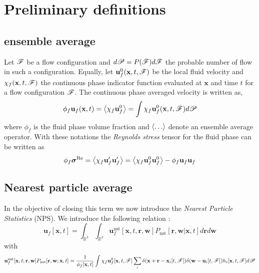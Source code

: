 \documentclass[11pt]{My_preprint}
\begin{document}
\section{Preliminary definitions}

\subsection{ensemble average}
Let $\mathscr{F}$ be a flow configuration and $d\mathscr{P} = P(\mathscr{F})d\mathscr{F}$ the probable number of flow in such a configuration. 
Equally, let $\textbf{u}_f^0(\textbf{x},t,\mathscr{F})$ be the local fluid velocity and $\chi_f(\textbf{x},t,\mathscr{F})$ the continuous phase indicator function evaluated at $\textbf{x}$ and time $t$ for a flow configuration $\mathscr{F}$. 
The continuous phase averaged velocity is written as, 
\begin{equation}
    \phi_f \textbf{u}_f(\textbf{x},t)
    = \left<\chi_f \textbf{u}_f^0\right> 
    = \int  \chi_f \textbf{u}_f^0(\textbf{x},t,\mathscr{F}) d\mathscr{P}
\end{equation}
where $\phi_f$ is the fluid phase volume fraction and $\left<\ldots\right>$ denote an ensemble average operator. 
With these notations the \textit{Reynolds stress} tensor for the fluid phase can be written as 
\begin{equation}
    \phi_f \bm\sigma^\text{Re}
    =\left<\chi_f \textbf{u}_f'\textbf{u}_f'\right>
    =\left<\chi_f \textbf{u}_f^0 \textbf{u}_f^0 \right>
    - \phi_f \textbf{u}_f \textbf{u}_f
\end{equation}
\subsection{Nearest particle average}
In the objective of closing this term we now introduce the \textit{Nearest Particle Statistics} (NPS). 
We introduce the following relation \citet{zhang2021ensemble} :
\begin{equation*}
    \textbf{u}_f [\textbf{x},t]
    = 
    \int_{\mathbb{R}^3}
    \int_{\mathbb{R}^3}
    \textbf{u}_f^\text{nst}[\textbf{x},t, \textbf{r},\textbf{w}]
    P_\text{nst}[\textbf{r},\textbf{w}|\textbf{x},t]
    d\textbf{r}
    d\textbf{w}
\end{equation*}
with 
\begin{equation*}
    \textbf{u}_f^\text{nst}[\textbf{x},t; \textbf{r},\textbf{w}]
    P_\text{nst}[\textbf{r},\textbf{w};\textbf{x},t]
    =
    \frac{1}{\phi_f[\textbf{x},t]} 
    \int 
    \chi_f \textbf{u}_f^0[\textbf{x},t,\mathscr{F}]
    \sum_i 
    \delta(\textbf{x}+\textbf{r}-\textbf{x}_i[t,\mathscr{F}])
    \delta(\textbf{w}-\textbf{u}_i[t,\mathscr{F}])
    h_i[\textbf{x},t,\mathscr{F}]
    d\mathscr{P}
\end{equation*}
\end{document}
